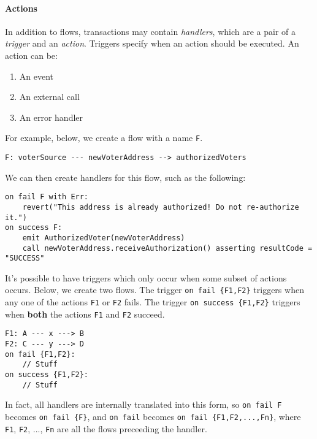 \documentclass[10pt]{article}
\begin{document}
\paragraph{Actions}
In addition to flows, transactions may contain \emph{handlers}, which are a pair of a \emph{trigger} and an \emph{action}.
Triggers specify when an action should be executed.
An action can be:
\begin{enumerate}
    \item An event
    \item An external call
    \item An error handler
\end{enumerate}


For example, below, we create a flow with a name \lstinline{F}.
\begin{lstlisting}
F: voterSource --- newVoterAddress --> authorizedVoters
\end{lstlisting}

We can then create handlers for this flow, such as the following:
\begin{lstlisting}
on fail F with Err:
    revert("This address is already authorized! Do not re-authorize it.")
on success F:
    emit AuthorizedVoter(newVoterAddress)
    call newVoterAddress.receiveAuthorization() asserting resultCode = "SUCCESS"
\end{lstlisting}

It's possible to have triggers which only occur when some subset of actions occurs.
Below, we create two flows.
The trigger \lstinline|on fail {F1,F2}| triggers when any one of the actions \lstinline{F1} or \lstinline{F2} fails.
The trigger \lstinline|on success {F1,F2}| triggers when \textbf{both} the actions \lstinline{F1} and \lstinline{F2} succeed.
\begin{lstlisting}
F1: A --- x ---> B
F2: C --- y ---> D
on fail {F1,F2}:
    // Stuff
on success {F1,F2}:
    // Stuff
\end{lstlisting}

In fact, all handlers are internally translated into this form, so \lstinline{on fail F} becomes \lstinline|on fail {F}|, and \lstinline{on fail} becomes \lstinline|on fail {F1,F2,...,Fn}|, where \lstinline{F1}, \lstinline{F2}, ..., \lstinline{Fn} are all the flows preceeding the handler.
\end{document}
